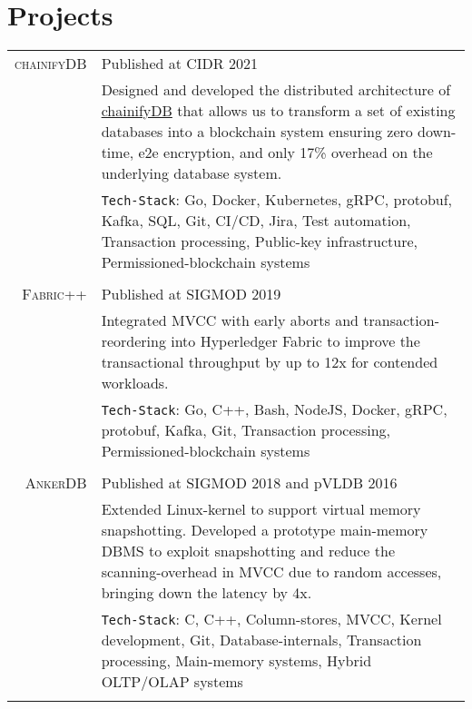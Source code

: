 \documentclass[a4paper,10pt]{article} %
\begin{document}
\section{Projects}
\vspace*{0.2cm}
\begin{tabular}{rp{14.5cm}}
	\textsc{chainifyDB} & Published at CIDR 2021 \\
	& \small{Designed and developed the distributed architecture of \href{www.chainifydb.com}{chainifyDB} that allows us to transform a set of existing databases into a 
		blockchain system ensuring zero down-time, e2e encryption, and only 17\% overhead on the underlying database system.}\\
	& \texttt{Tech-Stack}: Go, Docker, Kubernetes, gRPC, protobuf, Kafka, SQL, Git, CI/CD, Jira, Test automation, Transaction processing, Public-key infrastructure, Permissioned-blockchain systems\\
	\multicolumn{2}{c}{} \\
	
	
	\textsc{Fabric++} & Published at SIGMOD 2019 \\ 
	& \small{Integrated MVCC with early aborts and transaction-reordering into Hyperledger Fabric to improve the transactional throughput by up to 12x for contended workloads.}\\
		& \texttt{Tech-Stack}: Go, C++, Bash, NodeJS, Docker, gRPC, protobuf, Kafka, Git, Transaction processing, Permissioned-blockchain systems\\
	\multicolumn{2}{c}{} \\
	
	
	\textsc{AnkerDB} & Published at SIGMOD 2018 and pVLDB 2016\\
	&\small{Extended Linux-kernel to support virtual memory snapshotting. Developed a prototype main-memory DBMS to exploit snapshotting and reduce the scanning-overhead in MVCC due to random accesses, bringing down the latency by 4x.}\\
		& \texttt{Tech-Stack}: C, C++, Column-stores, MVCC, Kernel development, Git, Database-internals, Transaction processing, Main-memory systems, Hybrid OLTP/OLAP systems\\
	\multicolumn{2}{c}{} \\


\end{tabular}
\end{document}
